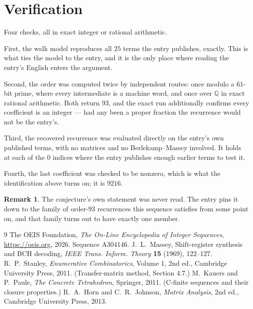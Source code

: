 \documentclass[11pt,a4paper]{article}
\theoremstyle{plain}
\theoremstyle{definition}
\newtheorem{remark}[theorem]{Remark}
\begin{document}
\section{Verification}

Four checks, all in exact integer or rational arithmetic.

First, the walk model reproduces all $25$ terms the entry publishes, exactly. This is
what ties the model to the entry, and it is the only place where reading the entry's English
enters the argument.

Second, the order was computed twice by independent routes: once modulo a $61$-bit prime, where
every intermediate is a machine word, and once over $\mathbb{Q}$ in exact rational arithmetic.
Both return $93$, and the exact run additionally confirms every coefficient is an integer
--- had any been a proper fraction the recurrence would not be the entry's.

Third, the recovered recurrence was evaluated directly on the entry's own published terms, with
no matrices and no Berlekamp--Massey involved. It holds at each of the $0$ indices where
the entry publishes enough earlier terms to test it.

Fourth, the last coefficient was checked to be nonzero, which is what the identification above
turns on; it is $9216$.

\begin{remark}
The conjecture's own statement was never read. The entry pins it down to the family of
order-$93$ recurrences this sequence satisfies from some point on, and that family turns
out to have exactly one member.
\end{remark}

\begin{thebibliography}{9}
 The OEIS Foundation, \emph{The On-Line Encyclopedia of Integer
Sequences}, \url{https://oeis.org}, 2026. Sequence A304146.
 J.~L.~Massey, Shift-register synthesis and BCH decoding, \emph{IEEE
Trans. Inform. Theory} \textbf{15} (1969), 122--127.
 R.~P.~Stanley, \emph{Enumerative Combinatorics}, Volume 1, 2nd ed.,
Cambridge University Press, 2011. (Transfer-matrix method, Section 4.7.)
 M.~Kauers and P.~Paule, \emph{The Concrete Tetrahedron}, Springer, 2011.
(C-finite sequences and their closure properties.)
 R.~A.~Horn and C.~R.~Johnson, \emph{Matrix Analysis}, 2nd ed., Cambridge
University Press, 2013.
\end{thebibliography}
\end{document}

